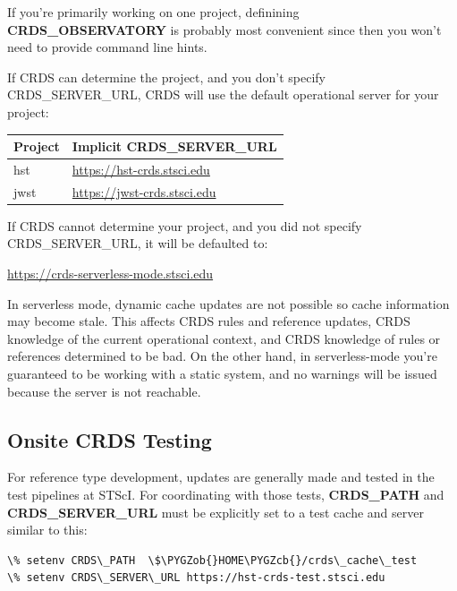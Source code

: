 \documentclass[letterpaper,10pt,english]{sphinxmanual}
\def\PYGZob{\char`\{}
\def\PYGZcb{\char`\}}
\begin{document}
If you're primarily working on one project,  definining \textbf{CRDS\_OBSERVATORY} is probably most convenient
since then you won't need to provide command line hints.

If CRDS can determine the project,  and you don't specify CRDS\_SERVER\_URL,  CRDS will use the default
operational server for your project:

\begin{tabulary}{\linewidth}{|L|L|}
\hline
\textbf{
Project
} & \textbf{
Implicit CRDS\_SERVER\_URL
}\\\hline

hst
 & 
\href{https://hst-crds.stsci.edu}{https://hst-crds.stsci.edu}
\\\hline

jwst
 & 
\href{https://jwst-crds.stsci.edu}{https://jwst-crds.stsci.edu}
\\\hline
\end{tabulary}


If CRDS cannot determine your project,  and you did not specify CRDS\_SERVER\_URL,  it will be defaulted to:

\href{https://crds-serverless-mode.stsci.edu}{https://crds-serverless-mode.stsci.edu}

In serverless mode, dynamic cache updates are not possible so cache information may become stale.  This affects CRDS
rules and reference updates,  CRDS knowledge of the current operational context, and CRDS knowledge of rules or
references determined to be bad.   On the other hand,  in serverless-mode you're guaranteed to be working with
a static system, and no warnings will  be issued because the server is not reachable.


\subsection{Onsite CRDS Testing}
\label{installation:onsite-crds-testing}
For reference type development,  updates are generally made and tested in the test pipelines at STScI.  For
coordinating with those tests,  \textbf{CRDS\_PATH} and \textbf{CRDS\_SERVER\_URL} must be explicitly set to a test cache and server
similar to this:

\begin{Verbatim}[commandchars=\\\{\}]
\% setenv CRDS\_PATH  \$\PYGZob{}HOME\PYGZcb{}/crds\_cache\_test
\% setenv CRDS\_SERVER\_URL https://hst-crds-test.stsci.edu
\end{Verbatim}
\end{document}
